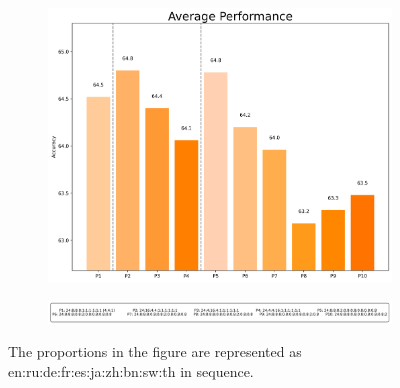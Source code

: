 \documentclass[11pt]{article}
\begin{document}
\begin{figure}[h]
\begin{subfigure}[b]{0.3\linewidth}
        \includegraphics[width=\linewidth]{picture/figure4_average.png}
    \end{subfigure}
    \begin{subfigure}[b]{\linewidth}
        \centering
        \includegraphics[width=\linewidth]{picture/figure4_text.png}
    \end{subfigure}
    
    \caption{The proportions in the figure are represented as en:ru:de:fr:es:ja:zh:bn:sw:th
in sequence.}
\end{figure}
\end{document}
